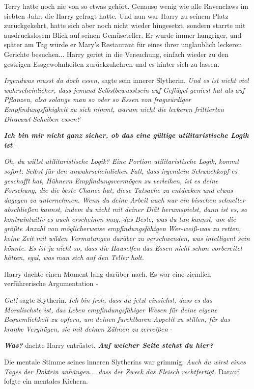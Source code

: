 Terry hatte noch nie von so etwas gehört. Genauso wenig wie alle Ravenclaws im
siebten Jahr, die Harry gefragt hatte. Und nun war Harry zu seinem Platz
zurückgekehrt, hatte sich aber noch nicht wieder hingesetzt, sondern starrte mit
ausdruckslosem Blick auf seinen Gemüseteller. Er wurde immer hungriger, und
später am Tag würde er Mary's Restaurant für eines ihrer unglaublich leckeren
Gerichte besuchen... Harry geriet in die Versuchung, einfach wieder zu den
gestrigen Essgewohnheiten zurückzukehren und es hinter sich zu lassen.

\emph{Irgendwas musst du doch essen, }sagte sein innerer Slytherin.
\emph{Und es ist nicht viel wahrscheinlicher, dass jemand Selbstbewusstsein auf Geflügel geniest hat als auf Pflanzen, also solange man so oder so Essen von fragwürdiger Empfindungsfähigkeit zu sich nimmt, warum nicht die leckeren frittierten Diracawl-Scheiben essen? }

\textbf{\emph{Ich bin mir nicht ganz sicher, ob das eine gültige
utilitaristische Logik ist}} -

\emph{Oh, du willst utilitaristische Logik? Eine Portion utilitaristische Logik, kommt sofort: Selbst für den unwahrscheinlichen Fall, dass irgendein Schwachkopf es geschafft hat, Hühnern Empfindungsvermögen zu verleihen, ist es deine Forschung, die die beste Chance hat, diese Tatsache zu entdecken und etwas dagegen zu unternehmen. Wenn du deine Arbeit auch nur ein bisschen schneller abschließen kannst, indem du nicht mit deiner Diät herumspielst, dann ist es, so kontraintuitiv es auch erscheinen mag, das Beste, was du tun kannst, um die größte Anzahl von möglicherweise empfindungsfähigen Wer-weiß-was zu retten, keine Zeit mit wilden Vermutungen darüber zu verschwenden, was intelligent sein könnte. Es ist ja nicht so, dass die Hauselfen das Essen nicht schon vorbereitet hätten, egal, was man sich auf den Teller holt. }

Harry dachte einen Moment lang darüber nach. Es war eine ziemlich verführerische
Argumentation -

\emph{Gut!} sagte Slytherin. \emph{Ich bin froh, dass du jetzt einsiehst, dass
es das Moralischste ist, das Leben empfindungsfähiger Wesen für deine eigene
Bequemlichkeit zu opfern, um deinen furchtbaren Appetit zu stillen, für das
kranke Vergnügen, sie mit deinen Zähnen zu zerreißen} -

\textbf{\emph{Was?}} dachte Harry entrüstet. \textbf{\emph{Auf welcher Seite
stehst du hier?}}

Die mentale Stimme seines inneren Slytherins war grimmig.
\emph{Auch du wirst eines Tages der Doktrin anhängen... dass der Zweck das Fleisch rechtfertigt. }
Darauf folgte ein mentales Kichern.


